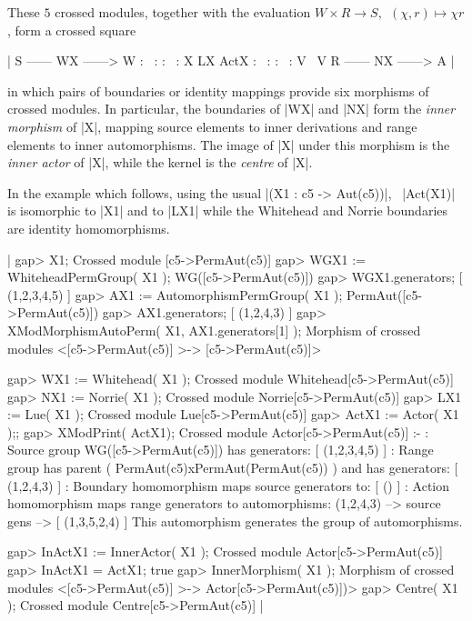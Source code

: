 These $5$ crossed modules, together with the evaluation  
$W \times R \to S, \ \ (\chi,r) \mapsto \chi r$, 
form a crossed square\:

|                        S ------ WX ------> W
                        :  \                :
                        :     \             :
                        X        LX        ActX
                        :           \       :
                        :              \    :
                        V                 \ V
                        R ------ NX ------> A  |

in which pairs of boundaries or identity mappings
provide six morphisms of crossed modules.
In particular, the boundaries of |WX| and |NX| form the
\emph{inner morphism} of |X|, mapping source elements to inner derivations
and range elements to inner automorphisms.  The image of |X| under this
morphism is the \emph{inner actor} of |X|, while the kernel 
is the \emph{centre} of |X|.

In the example which follows, using the usual |(X1 : c5 -> Aut(c5))|,
\ |Act(X1)|  is isomorphic to  |X1|  and to  |LX1|  
while the Whitehead and Norrie boundaries are identity homomorphisms.

|    gap> X1;
    Crossed module [c5->PermAut(c5)]
    gap> WGX1 := WhiteheadPermGroup( X1 );
    WG([c5->PermAut(c5)])
    gap> WGX1.generators;
    [ (1,2,3,4,5) ]
    gap> AX1 := AutomorphismPermGroup( X1 );
    PermAut([c5->PermAut(c5)])
    gap> AX1.generators;
    [ (1,2,4,3) ]
    gap> XModMorphismAutoPerm( X1, AX1.generators[1] );
    Morphism of crossed modules <[c5->PermAut(c5)] >-> [c5->PermAut(c5)]>

    gap> WX1 := Whitehead( X1 );
    Crossed module Whitehead[c5->PermAut(c5)]
    gap> NX1 := Norrie( X1 );
    Crossed module Norrie[c5->PermAut(c5)]
    gap> LX1 := Lue( X1 );
    Crossed module Lue[c5->PermAut(c5)]
    gap> ActX1 := Actor( X1 );;
    gap> XModPrint( ActX1);
    Crossed module Actor[c5->PermAut(c5)] :- 
    : Source group WG([c5->PermAut(c5)]) has generators:
      [ (1,2,3,4,5) ]
    : Range group has parent ( PermAut(c5)xPermAut(PermAut(c5)) )
        and has generators:  [ (1,2,4,3) ]
    : Boundary homomorphism maps source generators to:
      [ () ]
    : Action homomorphism maps range generators to automorphisms:
      (1,2,4,3) --> { source gens --> [ (1,3,5,2,4) ] }
      This automorphism generates the group of automorphisms.

    gap> InActX1 := InnerActor( X1 );
    Crossed module Actor[c5->PermAut(c5)]
    gap> InActX1 = ActX1;
    true
    gap> InnerMorphism( X1 );
    Morphism of crossed modules
        <[c5->PermAut(c5)] >-> Actor[c5->PermAut(c5)])>
    gap> Centre( X1 );
    Crossed module Centre[c5->PermAut(c5)]  |

